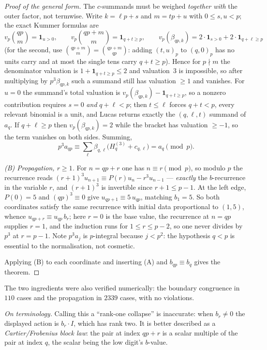 \begin{proof}[Proof of the general form]
The $c$-summands must be weighed \emph{together with} the outer factor, not termwise.  Write
$k=\ell p+s$ and $m=tp+u$ with $0\le s,u<p$; the exact Kummer formulas are
\[
  v_p\binom{qp}m=\mathbf 1_{u>0},\qquad
  v_p\binom{qp+m}m=\mathbf 1_{q+t\ge p},\qquad
  v_p(\beta_{qp,k})=2\cdot\mathbf 1_{s>0}+2\cdot\mathbf 1_{q+\ell\ge p}
\]
(for the second, use $\binom{qp+m}m=\binom{qp+m}{qp}$: adding $(t,u)_p$ to $(q,0)_p$ has no units
carry and at most the single tens carry $q+t\ge p$).  Hence for $p\nmid m$ the denominator
valuation is $1+\mathbf 1_{q+t\ge p}\le2$ and valuation~$3$ is impossible, so after multiplying by
$p^3\beta_{qp,k}$ such a summand still has valuation $\ge1$ and vanishes.  For $u=0$ the summand's
total valuation is $v_p(\beta_{qp,k})-\mathbf 1_{q+t\ge p}$, so a nonzero contribution requires
$s=0$ \emph{and} $q+\ell<p$; then $t\le\ell$ forces $q+t<p$, every relevant binomial is a unit,
and Lucas returns exactly the $(q,\ell,t)$ summand of $a_q$.  If $q+\ell\ge p$ then
$v_p(\beta_{qp,k})=2$ while the bracket has valuation $\ge-1$, so the term vanishes on both sides.
Summing,
\[
  p^3a_{qp}\equiv\sum_{\ell}\beta_{q,\ell}\bigl(H^{(3)}_q+c_{q,\ell}\bigr)=a_q\pmod p.
\]

\emph{(B) Propagation, $r\ge1$.}  For $n=qp+r$ one has $n\equiv r\pmod p$, so modulo $p$ the
recurrence reads $(r+1)^3u_{n+1}\equiv P(r)u_n-r^3u_{n-1}$ — \emph{exactly} the $b$-recurrence in
the variable $r$, and $(r+1)^3$ is invertible since $r+1\le p-1$.  At the left edge, $P(0)=5$ and
$(qp)^3\equiv0$ give $u_{qp+1}\equiv5\,u_{qp}$, matching $b_1=5$.  So both coordinates satisfy the
same recurrence with initial data proportional to $(1,5)$, whence $u_{qp+r}\equiv u_{qp}\,b_r$;
here $r=0$ is the base value, the recurrence at $n=qp$ supplies $r=1$, and the induction runs for
$1\le r\le p-2$, so one never divides by $p^3$ at $r=p-1$.  Note $p^3a_j$ is $p$-integral because
$j<p^2$: the hypothesis $q<p$ is essential to the normalisation, not cosmetic.

Applying (B) to each coordinate and inserting (A) and $b_{qp}\equiv b_q$ gives the theorem.
\end{proof}

The two ingredients were also verified numerically: the boundary congruence in $110$ cases and
the propagation in $2339$ cases, with no violations.

\emph{On terminology.}  Calling this a ``rank-one collapse'' is inaccurate: when $b_r\ne0$ the
displayed action is $b_r\cdot I$, which has rank two.  It is better described as a
\emph{Cartier/Frobenius block law}: the pair at index $qp+r$ is a scalar multiple of the pair at
index $q$, the scalar being the low digit's $b$-value.

